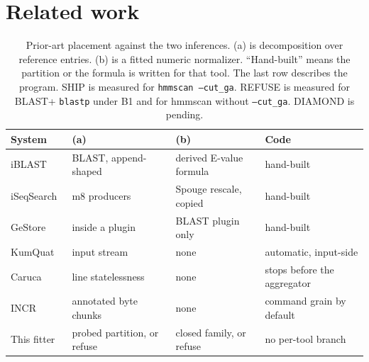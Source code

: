 \documentclass[letterpaper,twocolumn,10pt]{article}
\begin{document}
\section{Related work}
\label{sec:rw}

\begin{table}[t]
\caption{Prior-art placement against the two inferences.
(a) is decomposition over reference entries.
(b) is a fitted numeric normalizer.
``Hand-built'' means the partition or the formula is written for that tool.
The last row describes the program.
SHIP is measured for \texttt{hmmscan --cut\_ga}.
REFUSE is measured for BLAST+ \texttt{blastp} under B1 and for hmmscan without \texttt{--cut\_ga}.
DIAMOND is pending.}
\label{tab:prior}
\small
\begin{tabular}{@{}llll@{}}
\toprule
System & (a) & (b) & Code \\
\midrule
iBLAST~\cite{dash2021iblast} & BLAST, append-shaped & derived E-value formula & hand-built \\
iSeqSearch~\cite{yoo2025iseqsearch} & m8 producers & Spouge rescale, copied & hand-built \\
GeStore~\cite{pedersen2014gestore} & inside a plugin & BLAST plugin only & hand-built \\
KumQuat~\cite{shen2022kumquat} & input stream & none & automatic, input-side \\
Caruca~\cite{lamprou2025caruca} & line statelessness & none & stops before the aggregator \\
INCR~\cite{xie2026incr} & annotated byte chunks & none & command grain by default \\
This fitter & probed partition, or refuse & closed family, or refuse & no per-tool branch \\
\bottomrule
\end{tabular}
\end{table}
\end{document}
